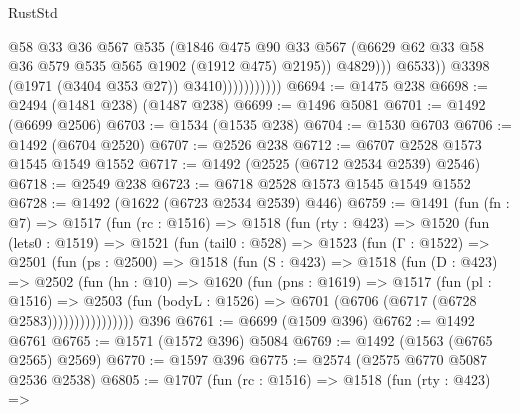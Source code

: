 \begin{lexlean}{RustStd}
\begin{coremodule}
                                    @58
                                    @33
                                    @36
                                    @567
                                    @535
                                    (@1846
                                      @475
                                      @90
                                      @33
                                      @567
                                      (@6629
                                        @62
                                        @33
                                        @58
                                        @36
                                        @579
                                        @535
                                        @565
                                        @1902
                                        (@1912 @475)
                                        @2195))
                                    @4829)))
                              @6533))
                          @3398
                          (@1971 (@3404 @353 @27))
                          @3410)))))))))))
@6694 := @1475 @238
@6698 := @2494 (@1481 @238) (@1487 @238)
@6699 := @1496 @5081
@6701 := @1492 (@6699 @2506)
@6703 := @1534 (@1535 @238)
@6704 := @1530 @6703
@6706 := @1492 (@6704 @2520)
@6707 := @2526 @238
@6712 := @6707 @2528 @1573 @1545 @1549 @1552
@6717 := @1492 (@2525 (@6712 @2534 @2539) @2546)
@6718 := @2549 @238
@6723 := @6718 @2528 @1573 @1545 @1549 @1552
@6728 := @1492 (@1622 (@6723 @2534 @2539) @446)
@6759 := @1491
    (fun (fn : @7) =>
    @1517
      (fun (rc : @1516) =>
      @1518
        (fun (rty : @423) =>
        @1520
          (fun (lets0 : @1519) =>
          @1521
            (fun (tail0 : @528) =>
            @1523
              (fun (Γ : @1522) =>
              @2501
                (fun (ps : @2500) =>
                @1518
                  (fun (S : @423) =>
                  @1518
                    (fun (D : @423) =>
                    @2502
                      (fun (hn : @10) =>
                      @1620
                        (fun (pns : @1619) =>
                        @1517
                          (fun (pl : @1516) =>
                          @2503
                            (fun (bodyL : @1526) => @6701 (@6706 (@6717 (@6728 @2583))))))))))))))))
    @396
@6761 := @6699 (@1509 @396)
@6762 := @1492 @6761
@6765 := @1571 (@1572 @396) @5084
@6769 := @1492 (@1563 (@6765 @2565) @2569)
@6770 := @1597 @396
@6775 := @2574 (@2575 @6770 @5087 @2536 @2538)
@6805 := @1707
    (fun (rc : @1516) =>
    @1518
      (fun (rty : @423) =>

\end{coremodule}
\end{lexlean}
